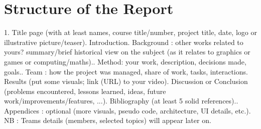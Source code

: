 \section*{Structure of the Report}
1. Title page (with at least names, course title/number, project title, date, logo or illustrative picture/teaser)\newline {}. Introduction\newline {}. Background : other works related to yours? summary/brief historical view on the subject (as  it relates to graphics or games or computing/maths).\newline {}. Method: your work, description, decisions made, goals.\newline {}. Team : how the project was managed, share of work, tasks, interactions\newline {}. Results (put some visuals; link (URL) to your video)\newline {}. Discussion or Conclusion (problems encountered, lessons learned, ideas, future work/improvements/features, ...)\newline {}. Bibliography (at least 5 solid references).\newline {}. Appendices : optional (more visuals, pseudo code, architecture, UI details, etc.)\newline {}. NB : Teams details (members, selected topics) will appear later on.\newline 
